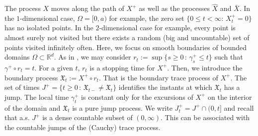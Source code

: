 \documentclass[11pt,a4paper]{article}
\begin{document}
\vspace{.5cm}

The process $X$ moves along the path of $X^+$ as well as the processes $\hat{X}$ and $\bar{X}$. In the $1$-dimensional case, $\Omega=[0, a)$ for example, the zero set $\{0\leq t < \infty :\, X^+_t=0\}$ has no isolated points. In the $2$-dimensional case for example, every point is almost surely not visited but there exists a random (big and uncountable) set of points visited infinitely often. Here, we focus on smooth boundaries of bounded domains $\Omega \subset \mathbb{R}^d$. As in \cite{HSU86}, we may consider $r_t:=\sup\{s\geq 0\,:\, \gamma^+_s \leq t\}$ such that $\gamma^+ \circ r_t = t$. For a given $t$, $r_t$ is a stopping time for $X^+$. Then, we introduce the boundary process $\mathfrak{X}_t := X^+ \circ r_t$. That is the boundary trace process of $X^+$. The set of times $J^+=\{t \geq 0\,:\, \mathfrak{X}_{t-} \neq \mathfrak{X}_t\}$ identifies the instants at which $\mathfrak{X}_t$ has a jump. The local time $\gamma^+_t$ is constant only for the excursions of $X^+$ on the interior of the domain and $\mathfrak{X}_t$ is a pure jump process. We write $J^+_t = J^+ \cap (0,t]$ and recall that a.s. $J^+$ is a dense countable subset of $(0,\infty)$. This can be associated with the countable jumps of the (Cauchy) trace process. 
\end{document}
